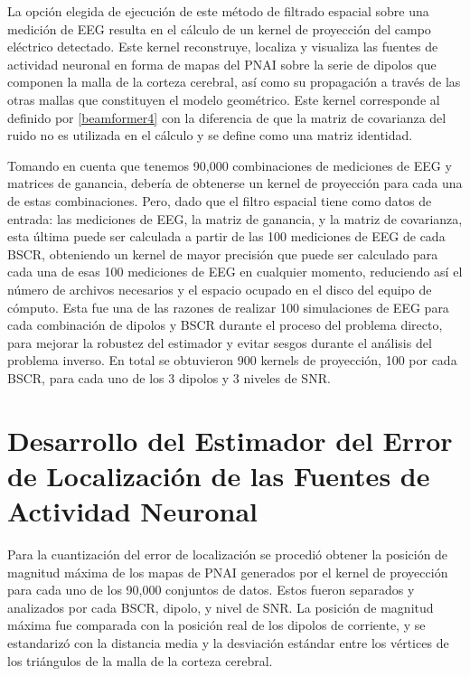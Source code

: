 La opción elegida de ejecución de este método de filtrado espacial sobre una medición de EEG resulta en el cálculo de un kernel de proyección del campo eléctrico detectado.
Este kernel reconstruye, localiza y visualiza las fuentes de actividad neuronal en forma de mapas del PNAI sobre la serie de dipolos que componen la malla de la corteza cerebral, así como su propagación a través de las otras mallas que constituyen el modelo geométrico.
Este kernel corresponde al definido por \cref{beamformer4} con la diferencia de que la matriz de covarianza del ruido no es utilizada en el cálculo y se define como una matriz identidad.

Tomando en cuenta que tenemos 90,000 combinaciones de mediciones de EEG y matrices de ganancia, debería de obtenerse un kernel de proyección para cada una de estas combinaciones.
Pero, dado que el filtro espacial tiene como datos de entrada: las mediciones de EEG, la matriz de ganancia, y la matriz de covarianza, esta última puede ser calculada a partir de las 100 mediciones de EEG de cada BSCR, obteniendo un kernel de mayor precisión que puede ser calculado para cada una de esas 100 mediciones de EEG en cualquier momento, reduciendo así el número de archivos necesarios y el espacio ocupado en el disco del equipo de cómputo.
Esta fue una de las razones de realizar 100 simulaciones de EEG para cada combinación de dipolos y BSCR durante el proceso del problema directo, para mejorar la robustez del estimador y evitar sesgos durante el análisis del problema inverso.
En total se obtuvieron 900 kernels de proyección, 100 por cada BSCR, para cada uno de los 3 dipolos y 3 niveles de SNR.

\section{Desarrollo del Estimador del Error de Localización de las Fuentes de Actividad Neuronal}
\label{sec:methodology:estimator}

Para la cuantización del error de localización se procedió obtener la posición de magnitud máxima de los mapas de PNAI generados por el kernel de proyección para cada uno de los 90,000 conjuntos de datos. Estos fueron separados y analizados por cada BSCR, dipolo, y nivel de SNR.
La posición de magnitud máxima fue comparada con la posición real de los dipolos de corriente, y se estandarizó con la distancia media y la desviación estándar entre los vértices de los triángulos de la malla de la corteza cerebral. 

